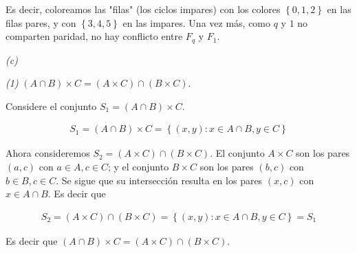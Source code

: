 \documentclass[a4paper, 12pt]{article}
\begin{document}
Es decir, coloreamos las "filas" (los ciclos impares) con los colores $\left\{
0, 1, 2 \right\} $ en las filas pares, y con $\left\{ 3, 4, 5 \right\} $ en las
impares. Una vez más, como $q$ y $1$ no comparten paridad, no hay conflicto
entre $F_q$ y $F_1$.

\pagebreak 

\textit{(c)}   


\textit{(1)} $(A \cap  B) \times C = (A \times C) \cap (B \times C) $.

Considere el conjunto $S_1 = (A \cap B) \times C$. 

\begin{align*}
    S_1 = (A \cap B) \times C = \left\{ (x, y) : x \in A \cap B, y \in C \right\} 
\end{align*}

Ahora consideremos $S_2 = (A \times C) \cap (B \times C)$. El conjunto 
$A \times C$ son los pares $(a, c)$ con $a \in A, c \in C$; 
y el conjunto $B \times C$ son los pares $(b, c)$ con 
$b \in B, c \in C$. Se sigue que su intersección
resulta en los pares $(x, c)$ con $x \in A \cap B$. Es decir que 

\begin{align*}
    S_2 = (A \times C) \cap (B \times C) = \left\{ (x, y) : x \in A \cap B, y \in C \right\} = S_1
\end{align*}

Es decir que $(A \cap B) \times C = (A \times C) \cap  (B \times C)$.
\end{document}
